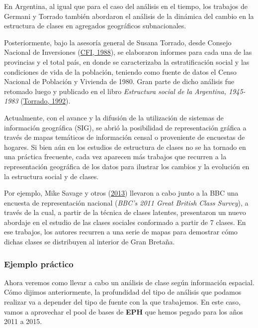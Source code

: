 \documentclass[
]{article}
\begin{document}
En Argentina, al igual que para el caso del análisis en el tiempo, los trabajos de Germani y Torrado también abordaron el análisis de la dinámica del cambio en la estructura de clases en agregados geográficos subnacionales.

Posteriormente, bajo la asesoría general de Susana Torrado, desde Consejo Nacional de Inversiones (\protect\hyperlink{ref-CFI1988}{CFI, 1988}), se elaboraron informes para cada una de las provincias y el total país, en donde se caracterizaba la estratificación social y las condiciones de vida de la población, teniendo como fuente de datos el Censo Nacional de Población y Vivienda de 1980. Gran parte de dicho análisis fue retomado luego y publicado en el libro \emph{Estructura social de la Argentina, 1945-1983} (\protect\hyperlink{ref-Torrado1992}{Torrado, 1992}).

Actualmente, con el avance y la difusión de la utilización de sistemas de información geográfica (SIG), se abrió la posibilidad de representación gráfica a través de mapas temáticos de información censal o proveniente de encuestas de hogares. Si bien aún en los estudios de estructura de clases no se ha tornado en una práctica frecuente, cada vez aparecen más trabajos que recurren a la representación geográfica de los datos para ilustrar los cambios y la evolución en la estructura social y de clases.

Por ejemplo, Mike Savage y otros (\protect\hyperlink{ref-Savage.etal2013}{2013}) llevaron a cabo junto a la BBC una encuesta de representación nacional (\emph{BBC's 2011 Great British Class Survey}), a través de la cual, a partir de la técnica de clases latentes, presentaron un nuevo abordaje en el estudio de las clases sociales conformado a partir de 7 clases. En ese trabajos, los autores recurren a una serie de mapas para demostrar cómo dichas clases se distribuyen al interior de Gran Bretaña.

\hypertarget{ejemplo-pruxe1ctico-1}{%
\subsubsection{Ejemplo práctico}\label{ejemplo-pruxe1ctico-1}}

Ahora veremos como llevar a cabo un análisis de clase según información espacial. Cómo dijimos anteriormente, la profundidad del tipo de análisis que podamos realizar va a depender del tipo de fuente con la que trabajemos. En este caso, vamos a aprovechar el pool de bases de \textbf{EPH} que hemos pegado para los años 2011 a 2015.
\end{document}
